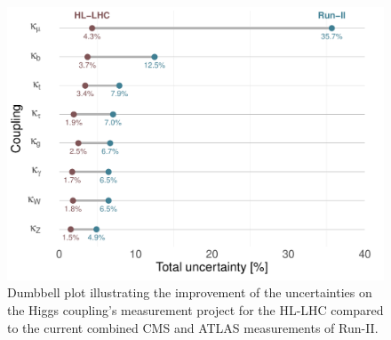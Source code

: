 \begin{figure}[htb!]
	\begin{center}
		\includegraphics[height=0.35\textheight]{figures/run2-hl-dumble}
		\caption{Dumbbell plot illustrating the improvement of the uncertainties on the Higgs coupling's measurement project for the HL-LHC compared to the current combined CMS and ATLAS measurements of Run-II.}	
		\label{fig:couplings-hlhlc}
	\end{center}
\end{figure}

